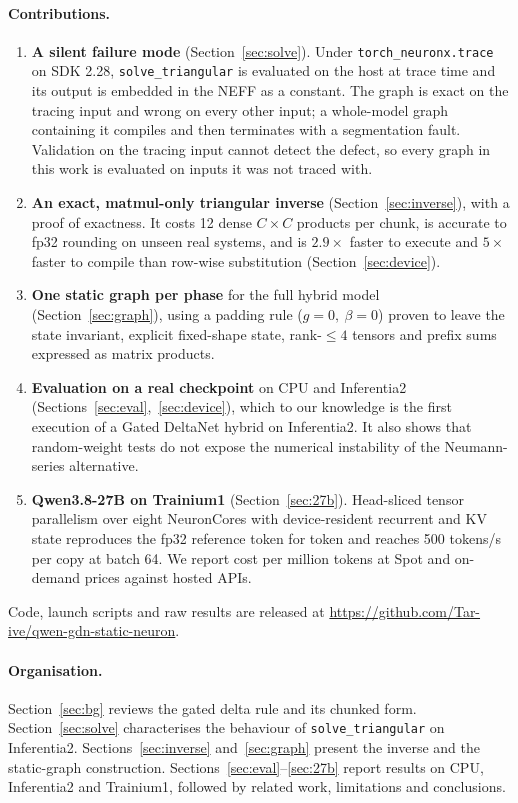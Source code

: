 \documentclass[11pt]{article}
\theoremstyle{remark}
\begin{document}
\paragraph{Contributions.}
\begin{enumerate}
\item \textbf{A silent failure mode} (Section~\ref{sec:solve}). Under \texttt{torch\_neuronx.trace} on SDK 2.28,
\texttt{solve\_triangular} is evaluated on the host at trace time and its output is embedded in the NEFF as a constant. The
graph is exact on the tracing input and wrong on every other input; a whole-model graph containing it compiles and then
terminates with a segmentation fault. Validation on the tracing input cannot detect the defect, so every graph in this work
is evaluated on inputs it was not traced with.
\item \textbf{An exact, matmul-only triangular inverse} (Section~\ref{sec:inverse}), with a proof of exactness. It costs 12
dense $C\times C$ products per chunk, is accurate to fp32 rounding on unseen real systems, and is $2.9\times$ faster to execute
and $5\times$ faster to compile than row-wise substitution (Section~\ref{sec:device}).
\item \textbf{One static graph per phase} for the full hybrid model (Section~\ref{sec:graph}), using a padding rule
($g=0,\ \beta=0$) proven to leave the state invariant, explicit fixed-shape state, rank-$\le4$ tensors and prefix sums
expressed as matrix products.
\item \textbf{Evaluation on a real checkpoint} on CPU and Inferentia2 (Sections~\ref{sec:eval},~\ref{sec:device}), which to
our knowledge is the first execution of a Gated DeltaNet hybrid on Inferentia2. It also shows that random-weight tests do not
expose the numerical instability of the Neumann-series alternative.
\item \textbf{Qwen3.8-27B on Trainium1} (Section~\ref{sec:27b}). Head-sliced tensor parallelism over eight NeuronCores with
device-resident recurrent and KV state reproduces the fp32 reference token for token and reaches 500 tokens/s per copy at
batch 64. We report cost per million tokens at Spot and on-demand prices against hosted APIs.
\end{enumerate}
Code, launch scripts and raw results are released at \url{https://github.com/Tar-ive/qwen-gdn-static-neuron}.

\paragraph{Organisation.} Section~\ref{sec:bg} reviews the gated delta rule and its chunked form. Section~\ref{sec:solve}
characterises the behaviour of \texttt{solve\_triangular} on Inferentia2. Sections~\ref{sec:inverse} and~\ref{sec:graph}
present the inverse and the static-graph construction. Sections~\ref{sec:eval}--\ref{sec:27b} report results on CPU,
Inferentia2 and Trainium1, followed by related work, limitations and conclusions.
\end{document}
